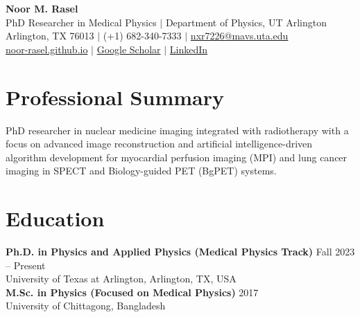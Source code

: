 \documentclass[11pt,letterpaper]{article}
\begin{document}
\begin{center}
    {\Huge \textbf{Noor M. Rasel}}\\ \vspace{1.5mm}
    PhD Researcher in Medical Physics $|$ Department of Physics, UT Arlington\\ \vspace{1mm}
    Arlington, TX 76013 $|$ (+1) 682-340-7333 $|$ \href{mailto:nxr7226@mavs.uta.edu}{nxr7226@mavs.uta.edu}\\ \vspace{1mm}
    \href{https://noor-rasel.github.io}{noor-rasel.github.io} $|$ 
    \href{https://scholar.google.com/citations?user=KGMNhDIAAAAJ&hl=en}{Google Scholar} $|$ 
    \href{https://www.linkedin.com/in/noor-m-rasel/}{LinkedIn}
\end{center}

\section*{Professional Summary}
PhD researcher in nuclear medicine imaging integrated with radiotherapy with a focus on advanced image reconstruction and artificial intelligence-driven algorithm development for myocardial perfusion imaging (MPI) and lung cancer imaging in SPECT and Biology-guided PET (BgPET) systems.

\section*{Education}
\textbf{Ph.D. in Physics and Applied Physics (Medical Physics Track)} \hfill Fall 2023 -- Present\\
University of Texas at Arlington, Arlington, TX, USA\\[1.5mm]
\textbf{M.Sc. in Physics (Focused on Medical Physics)} \hfill 2017\\
University of Chittagong, Bangladesh

\end{document}
